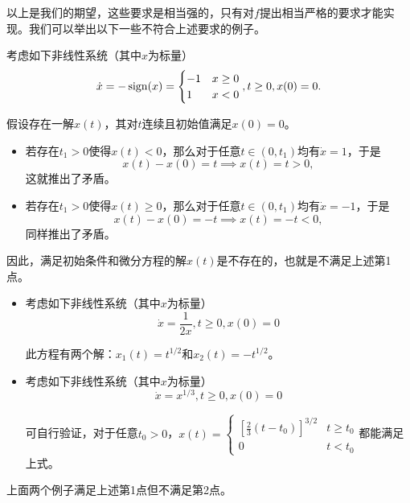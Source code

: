 以上是我们的期望，这些要求是相当强的，只有对$f$提出相当严格的要求才能实现。我们可以举出以下一些不符合上述要求的例子。
\begin{example}[不存在解] 
  考虑如下非线性系统（其中$x$为标量）
  \begin{equation*}
    \dot{x}=-\operatorname{sign}(x)=\begin{cases}
      -1&x\ge0\\
      1&x<0
    \end{cases},t\ge 0,x(0)=0.
  \end{equation*}

  假设存在一解$x(t)$，其对$t$连续且初始值满足$x(0)=0$。
  \begin{itemize}[leftmargin=1em]
    \item 若存在$t_1>0$使得$x(t)<0$，那么对于任意$t\in(0,t_1)$均有$\dot{x}=1$，于是\[x(t)-x(0)=t\implies x(t)=t>0,\]这就推出了矛盾。
    \item 若存在$t_1>0$使得$x(t)\ge 0$，那么对于任意$t\in(0,t_1)$均有$\dot{x}=-1$，于是\[x(t)-x(0)=-t\implies x(t)=-t<0,\]同样推出了矛盾。
  \end{itemize}

  因此，满足初始条件和微分方程的解$x(t)$是不存在的，也就是不满足上述第1点。
\end{example}
\newpage
\begin{example}[解存在但不唯一] 
  \begin{itemize}[leftmargin=1em]
    \item 考虑如下非线性系统（其中$x$为标量）
    \begin{equation*}
      \dot{x}=\frac{1}{2x},t\ge 0,x(0)=0
    \end{equation*}
  
    此方程有两个解：$x_1(t)=t^{1/2}$和$x_2(t)=-t^{1/2}$。
    \item 考虑如下非线性系统（其中$x$为标量）
    \begin{equation*}
      \dot{x}=x^{1/3},t\ge 0,x(0)=0
    \end{equation*}
  
    可自行验证，对于任意$t_0>0$，$x(t)=\begin{cases}
      \left[\frac{2}{3}(t-t_0)\right]^{3/2}&t\ge t_0\\0&t<t_0
    \end{cases}$都能满足上式。
  \end{itemize}

  上面两个例子满足上述第1点但不满足第2点。
\end{example}

